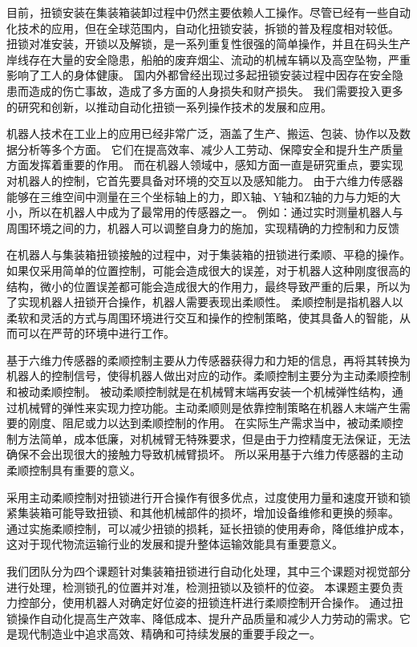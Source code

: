 \documentclass{seuthesis-2022}
\numberwithin{equation}{section}
\begin{document}
目前，扭锁安装在集装箱装卸过程中仍然主要依赖人工操作。尽管已经有一些自动化技术的应用，但在全球范围内，自动化扭锁安装，拆锁的普及程度相对较低。
扭锁对准安装，开锁以及解锁，是一系列重复性很强的简单操作，并且在码头生产岸线存在大量的安全隐患，船舶的废弃烟尘、流动的机械车辆以及高空坠物，严重影响了工人的身体健康。
国内外都曾经出现过多起扭锁安装过程中因存在安全隐患而造成的伤亡事故，造成了多方面的人身损失和财产损失\cite{平原2018机器人扭锁自动化装卸抓取规划研究}。
我们需要投入更多的研究和创新，以推动自动化扭锁一系列操作技术的发展和应用。

机器人技术在工业上的应用已经非常广泛，涵盖了生产、搬运、包装、协作以及数据分析等多个方面。
它们在提高效率、减少人工劳动、保障安全和提升生产质量方面发挥着重要的作用。
而在机器人领域中，感知方面一直是研究重点，要实现对机器人的控制，它首先要具备对环境的交互以及感知能力。
由于六维力传感器能够在三维空间中测量在三个坐标轴上的力，即X轴、Y轴和Z轴的力与力矩的大小，所以在机器人中成为了最常用的传感器之一。
例如：通过实时测量机器人与周围环境之间的力，机器人可以调整自身力的施加，实现精确的力控制和力反馈

在机器人与集装箱扭锁接触的过程中，对于集装箱的扭锁进行柔顺、平稳的操作。
如果仅采用简单的位置控制，可能会造成很大的误差，对于机器人这种刚度很高的结构，微小的位置误差都可能会造成很大的作用力，最终导致严重的后果，所以为了实现机器人扭锁开合操作，机器人需要表现出柔顺性。
柔顺控制是指机器人以柔软和灵活的方式与周围环境进行交互和操作的控制策略，使其具备人的智能，从而可以在严苛的环境中进行工作。

基于六维力传感器的柔顺控制主要从力传感器获得力和力矩的信息，再将其转换为机器人的控制信号，使得机器人做出对应的动作。柔顺控制主要分为主动柔顺控制和被动柔顺控制。
被动柔顺控制就是在机械臂末端再安装一个机械弹性结构，通过机械臂的弹性来实现力控功能。主动柔顺则是依靠控制策略在机器人末端产生需要的刚度、阻尼或力以达到柔顺控制的作用。
在实际生产需求当中，被动柔顺控制方法简单，成本低廉，对机械臂无特殊要求，但是由于力控精度无法保证，无法确保不会出现很大的接触力导致机械臂损坏。
所以采用基于六维力传感器的主动柔顺控制具有重要的意义。

采用主动柔顺控制对扭锁进行开合操作有很多优点，过度使用力量和速度开锁和锁紧集装箱可能导致扭锁、和其他机械部件的损坏，增加设备维修和更换的频率。
通过实施柔顺控制，可以减少扭锁的损耗，延长扭锁的使用寿命，降低维护成本，这对于现代物流运输行业的发展和提升整体运输效能具有重要意义。

我们团队分为四个课题针对集装箱扭锁进行自动化处理，其中三个课题对视觉部分进行处理，检测锁孔的位置并对准，检测扭锁以及锁杆的位姿。
本课题主要负责力控部分，使用机器人对确定好位姿的扭锁连杆进行柔顺控制开合操作。
通过扭锁操作自动化提高生产效率、降低成本、提升产品质量和减少人力劳动的需求。它是现代制造业中追求高效、精确和可持续发展的重要手段之一。
\end{document}
